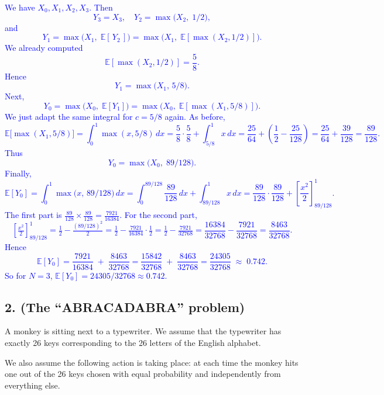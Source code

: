 \documentclass{article}
\begin{document}
\begin{enumerate}
\begin{enumerate}
        \textcolor{blue}{
         We have $X_0, X_1, X_2, X_3$. Then
\[
Y_3 = X_3,\quad
Y_2 = \max\bigl(X_2,\;1/2\bigr),
\]
and 
\[
Y_1
= \max\bigl(X_1,\;\mathbb{E}[\,Y_2\,]\bigr)
= \max\bigl(X_1,\;\mathbb{E}[\max(X_2,1/2)]\bigr).
\]
We already computed 
\[
\mathbb{E}[\max(X_2,1/2)]
= \frac{5}{8}.
\]
Hence 
\[
Y_1 = \max\bigl(X_1,\,5/8\bigr).
\]
Next,
\[
Y_0 = \max\bigl(X_0,\;\mathbb{E}[Y_1]\bigr)
= \max\bigl(X_0,\;\mathbb{E}[\max(X_1,5/8)]\bigr).
\]
We just adapt the same integral for $c=5/8$ again. As before,
\[
\mathbb{E}\bigl[\max(X_1,5/8)\bigr]
= \int_0^1 \max(x,5/8)\,dx
= \frac{5}{8}\cdot\frac{5}{8} + \int_{5/8}^1 x\,dx
= \frac{25}{64} + \left(\frac{1}{2} - \frac{25}{128}\right)
= \frac{25}{64} + \frac{39}{128}
= \frac{89}{128}.
\]
Thus
\[
Y_0 = \max\bigl(X_0,\; 89/128\bigr).
\]
Finally,
\[
\mathbb{E}[Y_0]
= \int_0^1 \max\bigl(x,\,89/128\bigr)\,dx
= \int_0^{89/128} \frac{89}{128}\,dx + \int_{89/128}^1 x\,dx
= \frac{89}{128}\cdot\frac{89}{128} 
  + \left[\frac{x^2}{2}\right]_{89/128}^1.
\]
The first part is 
\(\frac{89}{128}\times \frac{89}{128} = \frac{7921}{16384}.\)
For the second part,
\[
\left[\tfrac{x^2}{2}\right]_{89/128}^1
= \tfrac12 - \tfrac{(89/128)^2}{2}
= \tfrac12 - \tfrac{7921}{16384}\cdot \tfrac12
= \tfrac12 - \tfrac{7921}{32768}
= \frac{16384}{32768} - \frac{7921}{32768}
= \frac{8463}{32768}.
\]
Hence
\[
\mathbb{E}[Y_0]
= \frac{7921}{16384} \;+\; \frac{8463}{32768}
= \frac{15842}{32768} \;+\; \frac{8463}{32768}
= \frac{24305}{32768}
\;\approx\; 0.742.
\]
So for $N=3$, $\mathbb{E}[Y_0] = 24305/32768 \approx 0.742.$
        }

    \end{enumerate}
\end{enumerate}

\subsection*{2. (The “ABRACADABRA” problem)}

A monkey is sitting next to a typewriter. We assume that the typewriter has exactly 26 keys corresponding to the 26 letters of the English alphabet.

We also assume the following action is taking place: at each time the monkey hits one out of the 26 keys chosen with equal probability and independently from everything else.
\end{document}
